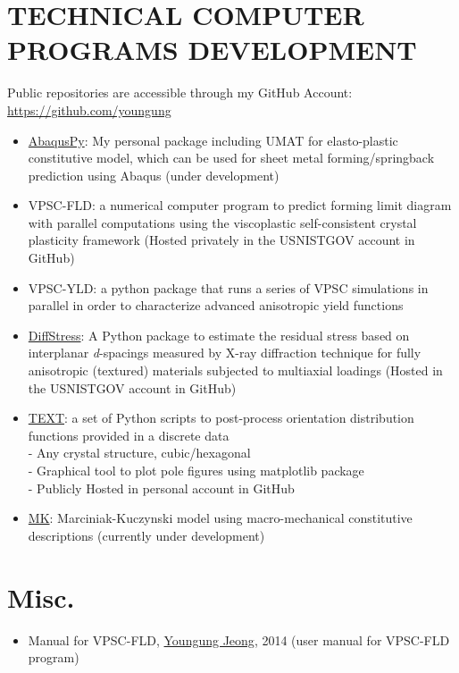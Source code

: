 \documentclass{res}
\begin{document}
\begin{resume}
  \section{TECHNICAL COMPUTER PROGRAMS DEVELOPMENT}
  Public repositories are accessible through my GitHub Account: \url{https://github.com/youngung}
  \begin{itemize}
  \item \href{https://github.com/youngung/abaquspy}{AbaqusPy}: My personal package including UMAT for elasto-plastic constitutive model, which can be used for sheet metal forming/springback prediction using Abaqus (under development)
  \item VPSC-FLD: a numerical computer program to predict forming limit diagram with parallel computations using the viscoplastic self-consistent crystal plasticity framework (Hosted privately in the USNISTGOV account in GitHub)
  \item VPSC-YLD: a python package that runs a series of VPSC simulations in parallel in order to characterize advanced anisotropic yield functions
  \item \href{https://github.com/usnistgov/DiffStress}{DiffStress}: A Python package to estimate the residual stress based on interplanar \emph{d}-spacings measured by X-ray diffraction technique for fully anisotropic (textured) materials subjected to multiaxial loadings (Hosted in the USNISTGOV account in GitHub)
  \item \href{https://github.com/youngung/texture}{TEXT}: a set of Python scripts to post-process orientation distribution functions provided in a discrete data\\
    - Any crystal structure, cubic/hexagonal\\
    - Graphical tool to plot pole figures using matplotlib package\\
    - Publicly Hosted in personal account in GitHub
  \item \href{https://github.com/youngung/mk}{MK}: Marciniak-Kuczynski model using macro-mechanical constitutive descriptions (currently under development)
  \end{itemize}

  \section{Misc.}
  \begin{itemize}
  \item Manual for VPSC-FLD, \underline{Youngung Jeong}, 2014 (user manual for VPSC-FLD program)
  \end{itemize}


\end{resume}
\end{document}
